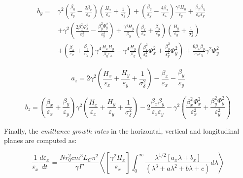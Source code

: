 \begin{equation}
    \begin{aligned}
    b_y = & \gamma^2 \left(\frac{\beta_y}{\varepsilon_y} - \frac{2 \beta_x}{\varepsilon_x}\right) \left(\frac{H_x}{\varepsilon_x} + \frac{1}{\sigma_{\delta}^{2}}\right) + \left(\frac{\beta_y}{\varepsilon_y} - \frac{4 \beta_x}{\varepsilon_x}\right) \frac{\gamma^2 H_y}{\varepsilon_y} + \frac{\beta_x \beta_y}{\varepsilon_x \varepsilon_y} \\
          & + \gamma^2 \left(\frac{2 \beta_x^{2} \Phi_x^{2}}{\varepsilon_x^{2}} - \frac{\beta_y^{2} \Phi_y^{2}}{\varepsilon_y^{2}}\right) + \frac{\gamma^4 H_y}{\beta_y} \left(\frac{\beta_x}{\varepsilon_x} + \frac{\beta_y}{\varepsilon_y}\right) \left(\frac{H_y}{\varepsilon_y} + \frac{1}{\sigma_{\delta}^{2}}\right)\\
          & + \left(\frac{\beta_x}{\varepsilon_x} + \frac{\beta_y}{\varepsilon_y}\right) \gamma^4 \frac{H_x H_y}{\beta_y \varepsilon_x} - \gamma^4 \frac{H_y}{\beta_y} \left(\frac{\beta_x^{2}}{\varepsilon_x^{2}} \Phi_x^{2} + \frac{\beta_y^{2}}{\varepsilon_y^{2}} \Phi_y^{2}\right) + \frac{6 \beta_x \beta_y}{\varepsilon_x \varepsilon_y} \gamma^2 \Phi_y^{2}
    \end{aligned}
    \label{equation:bm_by}
\end{equation}

\begin{equation}
    a_z = 2 \gamma^2 \left(\frac{H_x}{\varepsilon_x} + \frac{H_y}{\varepsilon_y} + \frac{1}{\sigma_{\delta}^{2}}\right) - \frac{\beta_x}{\varepsilon_x} - \frac{\beta_y}{\varepsilon_y}
    \label{equation:bm_az}
\end{equation}

\begin{equation}
    b_z = \left(\frac{\beta_x}{\varepsilon_x} + \frac{\beta_y}{\varepsilon_y}\right) \gamma^2 \left(\frac{H_x}{\varepsilon_x} + \frac{H_y}{\varepsilon_y} + \frac{1}{\sigma_{\delta}^{2}}\right) - 2 \frac{\beta_x \beta_y}{\varepsilon_x \varepsilon_y} - \gamma^2 \left(\frac{\beta_x^{2} \Phi_x^{2}}{\varepsilon_x^{2}} + \frac{\beta_y^{2} \Phi_y^{2}}{\varepsilon_y^{2}}\right)
    \label{equation:bm_bz}
\end{equation}

Finally, the \textit{emittance growth rates} in the horizontal, vertical and longitudinal planes are computed as:

\begin{equation}
    \boxed{\frac{1}{\varepsilon_x} \frac{d \varepsilon_x}{dt} = \frac{N r_0^{2} c m^3 L_C \pi^2}{\gamma \Gamma} \left< \left[\frac{\gamma^2 H_x}{\varepsilon_x}\right] \int_0^{\infty} \frac{\lambda^{1/2} \left[a_x \lambda + b_x\right]}{\left(\lambda^3 + a \lambda^2 + b \lambda + c\right)} d \lambda \right>}
    \label{equation:bm_tx}
\end{equation}

